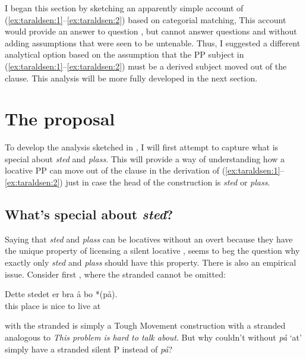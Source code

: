 \documentclass[output=paper]{LSP/langsci}
\begin{document}
I began this section by sketching an apparently simple account of (\ref{ex:taraldsen:1}--\ref{ex:taraldsen:2}) based on categorial matching, This account would provide an answer to question , but cannot answer questions  and  without adding assumptions that were seen to be untenable. Thus, I suggested a different analytical option based on the assumption that the PP subject in (\ref{ex:taraldsen:1}--\ref{ex:taraldsen:2}) must be a derived subject moved out of the  clause. This analysis will be more fully developed in the next section.

\section{The proposal}\label{sec:taraldsen:4}

To develop the analysis sketched in , I will first attempt to capture what is special about \textit{sted} and \textit{plass}. This will provide a way of understanding how a locative PP can move out of the  clause in the derivation of (\ref{ex:taraldsen:1}--\ref{ex:taraldsen:2}) just in case the head of the  construction is \textit{sted} or \textit{plass}.

\subsection{What’s special about \textit{sted}?}\label{sec:taraldsen:4.1}

Saying that \textit{sted} and \textit{plass} can be locatives without an overt  because they have the unique property of licensing a silent locative , seems to beg the question why exactly only \textit{sted} and \textit{plass} should have this property. There is also an empirical issue. Consider first , where the stranded  cannot be omitted:

\ea%
    \label{ex:taraldsen:35}
    \gll Dette stedet er bra å bo *(på).\\
	  this place is nice to live  at\\
\z

 with the stranded  is simply a Tough Movement construction with a stranded  analogous to \textit{This problem is hard to talk about}. But why couldn’t  without \textit{på} `at' simply have a stranded silent P instead of \textit{på}?
\end{document}
